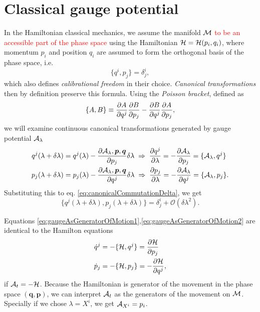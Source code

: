 \section{Classical gauge potential}
In the Hamiltonian classical mechanics, we assume the manifold $\mathcal{M}$ \textcolor{red}{to be an accessible part of the phase space} using the Hamiltonian $\mathcal{H}=\mathcal{H}(p_i,q_i)$, where momentum $p_i$ and position $q_i$ are assumed to form the orthogonal basis of the phase space, i.e.
\begin{equation}
    \{q^i,p_j\}=\delta^i_j,
    \label{eq:canonicalCommutationDelta}
\end{equation}
which also defines \emph{calibrational freedom} in their choice. \emph{Canonical transformations} then by definition preserve this formula. Using the \emph{Poisson bracket}, defined as
\begin{equation}
    \{A,B\}\equiv \frac{\partial A}{\partial q^j}\frac{\partial B}{\partial p_j}-\frac{\partial B}{\partial q^j}\frac{\partial A}{\partial p_j},
\end{equation}
we will examine continuous canonical transformations generated by gauge potential $\mathcal{A}_\lambda$
\begin{align}
        q^j(\lambda+\delta\lambda)&=q^j(\lambda)-\frac{\partial \mathcal{A}_\lambda,\bm{p},\bm{q}}{\partial p_j}\delta\lambda \;\Rightarrow\; \frac{\partial q^j}{\partial \lambda}=-\frac{\partial \mathcal{A}_\lambda}{\partial p_j}=\{\mathcal{A}_\lambda,q^j\}
        \label{eq:gaugeAsGeneratorOfMotion1}\\
        p_j(\lambda+\delta\lambda)&=p_j(\lambda)-\frac{\partial \mathcal{A}_\lambda,\bm{p},\bm{q}}{\partial q^j}\delta\lambda \;\Rightarrow\; \frac{\partial p_j}{\partial \lambda}=-\frac{\partial \mathcal{A}_\lambda}{\partial q^j}=\{\mathcal{A}_\lambda,p_j\}.
        \label{eq:gaugeAsGeneratorOfMotion2}
\end{align}
Substituting this to eq. \ref{eq:canonicalCommutationDelta}, we get
\begin{equation}
    \{q^j(\lambda+\delta\lambda),p_j(\lambda+\delta\lambda)\}=\delta^i_j + \mathcal{O}(\delta\lambda^2).
\end{equation}
 
Equations \ref{eq:gaugeAsGeneratorOfMotion1},\ref{eq:gaugeAsGeneratorOfMotion2} are identical to the Hamilton equations
\begin{equation}
\begin{split}
    \dot{q}^j&=-\{\mathcal{H},q^j\} = \frac{\partial \mathcal{H}}{\partial p_j}\\
    \dot{p}_j&=-\{\mathcal{H},p_j\} = -\frac{\partial \mathcal{H}}{\partial q^j},
\end{split}
\end{equation}
if $\mathcal{A}_t=-\mathcal{H}$. Because the Hamiltonian is generator of the movement in the phase space $(\bm{q},\bm{p})$, we can interpret $\mathcal{A}_t$ as the generators of the movement on $\mathcal{M}$. Specially if we chose $\lambda=X^i$, we get $\mathcal{A}_{X^i}=p_i$.




